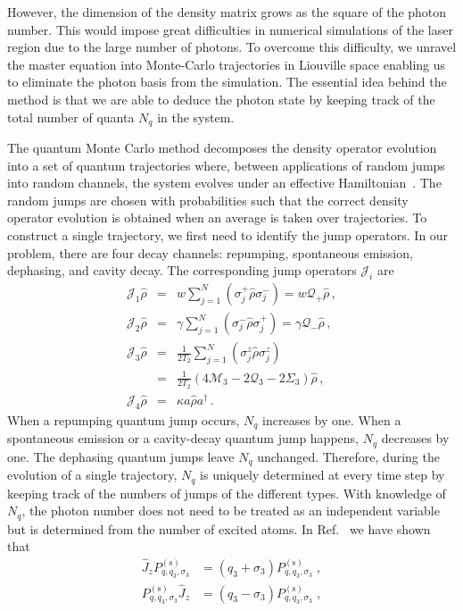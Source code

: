 \documentclass[aps,
twocolumn,
showpacs,
superscriptaddress,groupedaddress]{revtex4}
\begin{document}
However, the dimension of the density matrix grows as the square of the
photon number.  This would impose great difficulties in numerical
simulations of the laser region due to the large number of photons.  To
overcome this difficulty, we unravel the master equation into
Monte-Carlo trajectories in Liouville space enabling us to eliminate the
photon basis from the simulation.  The essential idea behind the method
is that we are able to deduce the photon state by keeping track of the
total number of quanta $N_q$ in the system.

The quantum Monte Carlo method decomposes the density operator evolution
into a set of quantum trajectories where, between applications of random
jumps into random channels, the system evolves under an effective
Hamiltonian~\cite{Dalibard92,Dum92,Knight98}.  The random jumps are
chosen with probabilities such that the correct density operator
evolution is obtained when an average is taken over trajectories.  To
construct a single trajectory, we first need to identify the jump
operators. In our problem, there are four decay channels: repumping,
spontaneous emission, dephasing, and cavity decay. The corresponding
jump operators $\mathcal{J}_i$ are
\begin{eqnarray}
\mathcal{J}_1\hat{\rho}&=&
w\sum_{j=1}^N(\sigma_j^+\hat{\rho}\sigma_j^-)=w\mathcal{Q}_{+}\hat{\rho}\,,
\nonumber\\
\mathcal{J}_2\hat{\rho}&=&
\gamma\sum_{j=1}^N(\sigma_j^-\hat{\rho}\sigma_j^+)=
\gamma \mathcal{Q}_{-}\hat{\rho}\,,\nonumber\\
\mathcal{J}_3\hat{\rho}&=&
\frac{1}{2T_2}\sum_{j=1}^N(\sigma_j^{z}\hat{\rho}\sigma_j^{z})
\nonumber\\
&=&\frac{1}{2T_2}(4\mathcal{M}_3-2  \mathcal{Q}_3-2\Sigma_3)\hat{\rho}\,,
\nonumber\\
\mathcal{J}_4\hat{\rho}&=&\kappa a\hat{\rho} a^{\dagger}\,.
\label{jumpo}
\end{eqnarray}
When a repumping quantum jump occurs, $N_q$ increases by one.  When a
spontaneous emission or a cavity-decay quantum jump happens, $N_q$
decreases by one.  The dephasing quantum jumps leave $N_q$ unchanged.
Therefore, during the evolution of a single trajectory, $N_q$ is
uniquely determined at every time step by keeping track of the numbers
of jumps of the different types. With knowledge of $N_q$, the photon
number does not need to be treated as an independent variable but is
determined from the number of excited atoms.  In
Ref.~\cite{PhysRevA.87.062101} we have shown that
\begin{equation}
\begin{split}
  \hat{J}_z P_{q,q_3,\sigma_3}^{(\mathrm{s})}&=
  (q_3+\sigma_3)P_{q,q_3,\sigma_3}^{(\mathrm{s})}\;,\\
  P_{q,q_3,\sigma_3}^{(\mathrm{s})}\hat{J}_z&=
  (q_3-\sigma_3)P_{q,q_3,\sigma_3}^{(\mathrm{s})}\;,
\end{split}
\end{equation}
\end{document}
